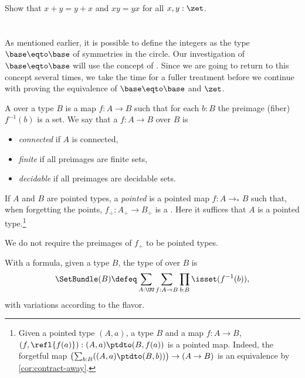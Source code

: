 \begin{xca}\label{xca:commutative-add-Z}
  Show that $x+y = y+x$ and $xy=yx$ for all $x,y:\zet$.
\end{xca}

\section{\Coverings}
\label{sec:covering}

As mentioned earlier, it is possible to define the integers as the
type $\base\eqto\base$ of symmetries in the circle.
Our investigation of $\base\eqto\base$ will use the concept of \coverings.
Since we are going to return to this concept several times,
we take the time for a fuller treatment before we continue with
proving the equivalence of $\base\eqto\base$ and $\zet$.

\begin{definition}\label{def:covering}
A \emph{\covering} over a type $B$
is a map $f:A\to B$ such that for each $b:B$ the preimage
(fiber) $f^{-1}(b)$ is a set.
We say that a \covering $f:A\to B$ over $B$ is
\begin{itemize}
\item \emph{connected} if $A$ is connected,
\item \emph{finite} if all preimages are finite sets,
\item \emph{decidable} if all preimages are decidable sets.
\end{itemize}

If $A$ and $B$ are pointed types, a \emph{pointed} \covering is a pointed map
$f:A\to_*B$ such that, when forgetting the points, $f_\div:A_\div\to B_\div$
is a \covering. Here it suffices that $A$ is a pointed type.\footnote{%
  Given a pointed type $(A,a)$, a type $B$ and a map $f : A \to B$,
  $(f,\refl{f(a)}) : (A,a) \ptdto (B,f(a))$ is a pointed map.
  Indeed, the forgetful map $\bigl(\sum_{b:B}((A,a)\ptdto(B,b))\bigr)
  \to (A \to B)$ is an equivalence by \cref{cor:contract-away}.}

We do not require the preimages of $f_\div$ to be pointed types.
\end{definition}
With a formula, given a type $B$, the type of \coverings over $B$ is
\[
\SetBundle(B) \defeq \sum_{A:\UU}\sum_{f:A\to B}\prod_{b:B}\isset(f^{-1}(b)),
\]
with variations according to the flavor.

